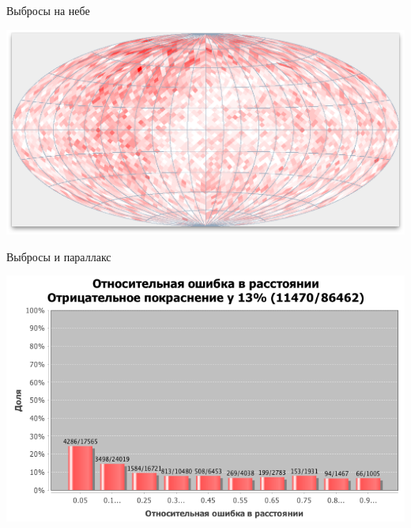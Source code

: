 \documentclass[14pt, fleqn, xcolor={dvipsnames, table}]{beamer}
\begin{document}
        \begin{frame}{Выбросы на небе}
            \begin{center}
                \includegraphics[scale=0.32]{outlier-map.png}
            \end{center}             
        \end{frame}   
        
        \begin{frame}{Выбросы и параллакс}
            \begin{center}
                \includegraphics[scale=0.49]{outlier-r.png}
            \end{center}             
        \end{frame}     
        
\end{document}
